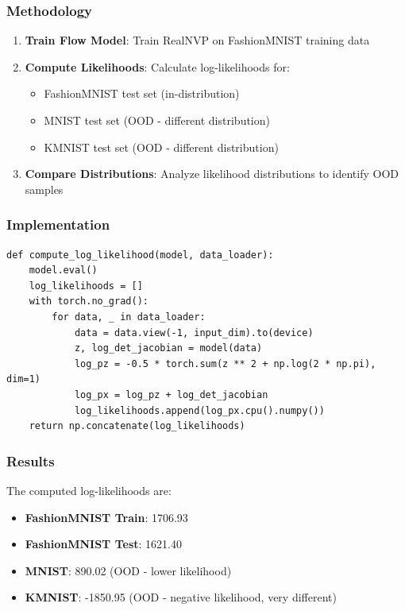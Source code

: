 \documentclass[conference,12pt]{IEEEtran}
\begin{document}
\subsubsection{Methodology}

\begin{enumerate}
    \item \textbf{Train Flow Model}: Train RealNVP on FashionMNIST training data
    \item \textbf{Compute Likelihoods}: Calculate log-likelihoods for:
    \begin{itemize}
        \item FashionMNIST test set (in-distribution)
        \item MNIST test set (OOD - different distribution)
        \item KMNIST test set (OOD - different distribution)
    \end{itemize}
    \item \textbf{Compare Distributions}: Analyze likelihood distributions to identify OOD samples
\end{enumerate}

\subsubsection{Implementation}

\begin{lstlisting}[caption={Log-Likelihood Computation for OOD Detection}]
def compute_log_likelihood(model, data_loader):
    model.eval()
    log_likelihoods = []
    with torch.no_grad():
        for data, _ in data_loader:
            data = data.view(-1, input_dim).to(device)
            z, log_det_jacobian = model(data)
            log_pz = -0.5 * torch.sum(z ** 2 + np.log(2 * np.pi), dim=1)
            log_px = log_pz + log_det_jacobian
            log_likelihoods.append(log_px.cpu().numpy())
    return np.concatenate(log_likelihoods)
\end{lstlisting}

\subsubsection{Results}

The computed log-likelihoods are:

\begin{itemize}
    \item \textbf{FashionMNIST Train}: 1706.93
    \item \textbf{FashionMNIST Test}: 1621.40
    \item \textbf{MNIST}: 890.02 (OOD - lower likelihood)
    \item \textbf{KMNIST}: -1850.95 (OOD - negative likelihood, very different)
\end{itemize}
\end{document}
